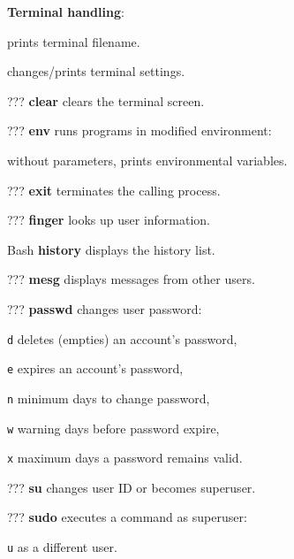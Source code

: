 \textbf{Terminal handling}:
\begin{compactenum}
	\item [\symbolcoreutils]  prints terminal filename.

	\item [\symbolcoreutils]  changes/prints terminal settings.
\end{compactenum}


\begin{compactenum}
	\item [???] \textbf{clear} clears the terminal screen.
	\item [???] \textbf{env} runs programs in modified environment:
	\item [] without parameters, prints environmental variables.
	\item [???] \textbf{exit} terminates the calling process.
	\item [???] \textbf{finger} looks up user information.
	\item [Bash] \textbf{history} displays the history list. %
	\item [???] \textbf{mesg} displays messages from other users.
\end{compactenum}

\begin{compactenum}
	\item [???] \textbf{passwd} changes user password:
	\item [\texttt{d}] deletes (empties) an account's password,
	\item [\texttt{e}] expires an account's password,
	\item [\texttt{n}] minimum days to change password,
	\item [\texttt{w}] warning days before password expire,
	\item [\texttt{x}] maximum days a password remains valid.
\end{compactenum}

\begin{compactenum}
        \item [???] \textbf{su} changes user ID or becomes superuser.
        \item [???] \textbf{sudo} executes a command as superuser:
        \item [\texttt{u}] as a different user.
\end{compactenum}

